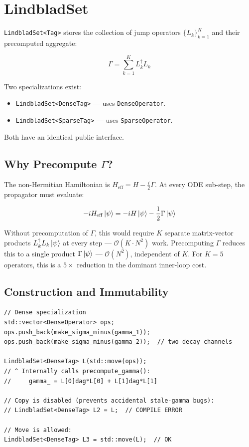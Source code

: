 \documentclass[11pt,a4paper,twoside]{book}
\newcommand{\Heff}{H_{\mathrm{eff}}}
\newcommand{\Order}{\mathcal{O}}
\newcommand{\code}[1]{\texttt{\small#1}}
\theoremstyle{definition}
\theoremstyle{remark}
\begin{document}
\section{LindbladSet}
\label{sec:lindbladset}

\code{LindbladSet<Tag>} stores the collection of jump operators
$\{L_k\}_{k=1}^{K}$ and their precomputed aggregate:

\begin{equation}
  \Gamma = \sum_{k=1}^{K} L_k^\dagger L_k
  \label{eq:gamma-aggregate}
\end{equation}

Two specializations exist:
\begin{itemize}
  \item \code{LindbladSet<DenseTag>} — uses \code{DenseOperator}.
  \item \code{LindbladSet<SparseTag>} — uses \code{SparseOperator}.
\end{itemize}

Both have an identical public interface.

\subsection{Why Precompute $\Gamma$?}
\label{subsec:gamma-precompute}

The non-Hermitian Hamiltonian is $\Heff = H - \tfrac{i}{2}\Gamma$.
At every ODE sub-step, the propagator must evaluate:

\begin{equation}
  -i\Heff\ket{\psi}
    = -iH\ket{\psi} - \frac{1}{2}\Gamma\ket{\psi}
  \label{eq:heff-apply}
\end{equation}

Without precomputation of $\Gamma$, this would require $K$ separate
matrix-vector products $L_k^\dagger L_k \ket{\psi}$ at every step —
$\Order(K \cdot N^2)$ work. Precomputing $\Gamma$ reduces this to a
single product $\Gamma\ket{\psi}$ — $\Order(N^2)$, independent of $K$.
For $K = 5$ operators, this is a $5\times$ reduction in the dominant
inner-loop cost.

\subsection{Construction and Immutability}
\label{subsec:lindblad-construction}

\begin{verbatim}
// Dense specialization
std::vector<DenseOperator> ops;
ops.push_back(make_sigma_minus(gamma_1));
ops.push_back(make_sigma_minus(gamma_2));  // two decay channels

LindbladSet<DenseTag> L(std::move(ops));
// ^ Internally calls precompute_gamma():
//     gamma_ = L[0]dag*L[0] + L[1]dag*L[1]

// Copy is disabled (prevents accidental stale-gamma bugs):
// LindbladSet<DenseTag> L2 = L;  // COMPILE ERROR

// Move is allowed:
LindbladSet<DenseTag> L3 = std::move(L);  // OK
\end{verbatim}
\end{document}
